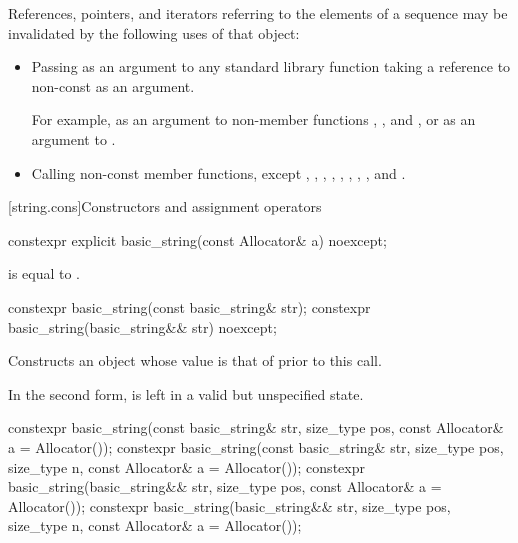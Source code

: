 \pnum
References, pointers, and iterators referring to the elements of a
 sequence may be
invalidated by the following uses of that  object:

\begin{itemize}
\item Passing as an argument to any standard library function taking a reference to non-const
 as an argument.
\begin{footnote}
For example, as an argument to non-member
functions ,
, and , or as
an argument to .
\end{footnote}

\item Calling non-const member functions, except
,
,
,
,
,
,
,
,
and
.
\end{itemize}

[string.cons]{Constructors and assignment operators}

%
\begin{itemdecl}
constexpr explicit basic_string(const Allocator& a) noexcept;
\end{itemdecl}

\begin{itemdescr}

\pnum
\ensures
{} is equal to .
\end{itemdescr}

%
\begin{itemdecl}
constexpr basic_string(const basic_string& str);
constexpr basic_string(basic_string&& str) noexcept;
\end{itemdecl}

\begin{itemdescr}
\pnum
\effects
Constructs an object whose
value is that of  prior to this call.

\pnum
\remarks
In the second form,  is left in a valid but unspecified state.
\end{itemdescr}

%
\begin{itemdecl}
constexpr basic_string(const basic_string& str, size_type pos,
                       const Allocator& a = Allocator());
constexpr basic_string(const basic_string& str, size_type pos, size_type n,
                       const Allocator& a = Allocator());
constexpr basic_string(basic_string&& str, size_type pos,
                       const Allocator& a = Allocator());
constexpr basic_string(basic_string&& str, size_type pos, size_type n,
                       const Allocator& a = Allocator());
\end{itemdecl}

